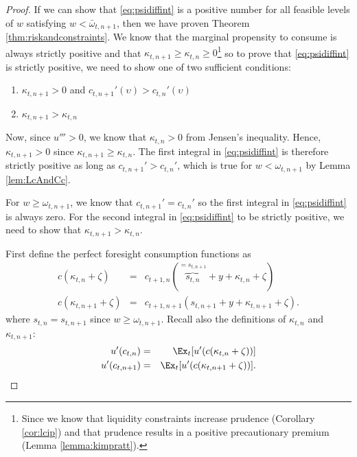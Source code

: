 \documentclass[titlepage]{\econtex}
\providecommand{\wAlt}{\omega}
\begin{document}
\begin{proof}
    If we can show that \eqref{eq:psidiffint} is a positive
    number for all feasible levels of ${w}$ satisfying ${w} < {\bar{\wAlt}}_{t,n+1}$, then we have proven Theorem \ref{thm:riskandconstraints}. We know that the marginal propensity to consume is always strictly positive and that $\kappa_{t,n+1} \geq \kappa_{t,n} \geq 0$\footnote{Since we know that liquidity constraints increase prudence (Corollary \ref{cor:lcip}) and that prudence results in a positive precautionary premium (Lemma \ref{lemma:kimpratt}).} so to prove that \eqref{eq:psidiffint} is strictly positive, we need to show one of two sufficient conditions:
    \begin{enumerate}
    \item $\kappa_{t,n+1} > 0$ and $c_{t,n+1}'(\upsilon) > c_{t,n}'(\upsilon)$
    \item $\kappa_{t,n+1} > \kappa_{t,n}$
    \end{enumerate}
    Now, since $u'''>0$, we know that $\kappa_{t,n} > 0$ from Jensen's inequality. Hence, $\kappa_{t,n+1} > 0$ since $\kappa_{t,n+1} \geq \kappa_{t,n}$. The first integral in \eqref{eq:psidiffint} is therefore strictly positive as long as $c_{t,n+1}' > c_{t,n}'$, which is true for ${w} < \wAlt_{t,n+1}$ by Lemma \ref{lem:LcAndCc}. 
    
    For ${w} \geq \wAlt_{t,n+1}$, we know that $c_{t,n+1}' = c_{t,n}'$ so the first integral in \eqref{eq:psidiffint} is always zero. For the second integral in \eqref{eq:psidiffint} to be strictly positive, we need to show that $\kappa_{t,n+1} > \kappa_{t,n}$. 
    
    
    
    
    
    First define the perfect foresight consumption functions as
    \begin{eqnarray}
      c(\kappa_{t,n}+\zeta) & = & c_{t+1,n}(\overbrace{{s}_{t,n}}^{=s_{t,n+1}}+{y}+\kappa_{t,n}+\zeta) \label{eq:cnoconstr}
      \\  {c}(\kappa_{t,n+1}+\zeta) & = & c_{t+1,n+1}({s}_{t,n+1}+{y}+\kappa_{t,n+1}+\zeta)\label{eq:gravecnoconstr}.
    \end{eqnarray}	
    where $s_{t,n} = s_{t,n+1}$ since $w \geq \wAlt_{t,n+1}$. Recall also the definitions of $\kappa_{t,n}$ and $\kappa_{t,n+1}$:
    \begin{eqnarray*}
      u'({c}_{t,n}) & = & \Ex_{t}[u'(c(\kappa_{t,n}+\zeta))]
      \\  u'({c}_{t,n+1}) & = & \Ex_{t}[u'({c}(\kappa_{t,n+1}+\zeta))].
    \end{eqnarray*}


\end{proof}
\end{document}
